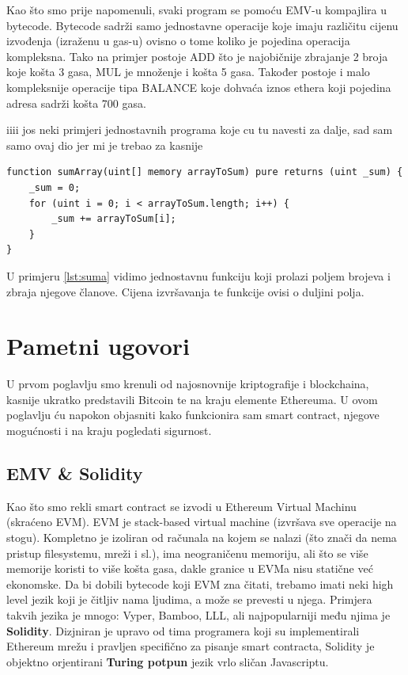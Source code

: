 \documentclass[a4paper,oneside,12pt]{memoir} %
\begin{document}
Kao što smo prije napomenuli, svaki program se pomoću EMV-u kompajlira u bytecode. Bytecode sadrži samo jednostavne operacije koje imaju različitu cijenu izvođenja (izraženu u gas-u) ovisno o tome koliko je pojedina operacija kompleksna. Tako na primjer postoje ADD što je najobičnije zbrajanje 2 broja koje košta 3 gasa, MUL je množenje i košta 5 gasa. Također postoje i malo kompleksnije operacije tipa BALANCE koje dohvaća iznos ethera koji pojedina adresa sadrži košta 700 gasa.

iiii jos neki primjeri jednostavnih programa koje cu tu navesti za dalje, sad sam samo ovaj dio   jer mi je trebao za kasnije

\begin{minipage}{\linewidth}
\begin{lstlisting}[caption = Primjer 1, language=solidity, label={lst:suma}]
function sumArray(uint[] memory arrayToSum) pure returns (uint _sum) {
    _sum = 0;
    for (uint i = 0; i < arrayToSum.length; i++) {
        _sum += arrayToSum[i];
    }
}
\end{lstlisting}
\end{minipage}

U primjeru \ref{lst:suma} vidimo jednostavnu funkciju koji prolazi poljem brojeva i zbraja njegove članove. Cijena izvršavanja te funkcije ovisi o duljini polja.

\chapter{Pametni ugovori}

U prvom poglavlju smo krenuli od najosnovnije kriptografije i blockchaina, kasnije ukratko predstavili Bitcoin te na kraju elemente Ethereuma. U ovom poglavlju ću napokon objasniti kako funkcionira sam smart contract, njegove mogućnosti i na kraju pogledati sigurnost.

\section{EMV \& Solidity}

Kao što smo rekli smart contract se izvodi u Ethereum Virtual Machinu (skraćeno EVM). EVM je stack-based virtual machine (izvršava sve operacije na stogu). Kompletno je izoliran od računala na kojem se nalazi (što znači da nema pristup filesystemu, mreži i sl.), ima neograničenu memoriju, ali što se više memorije koristi to više košta gasa, dakle granice u EVMa nisu statične već ekonomske. Da bi dobili bytecode koji EVM zna čitati, trebamo imati neki high level jezik koji je čitljiv nama ljudima, a može se prevesti u njega. Primjera takvih jezika je mnogo: Vyper, Bamboo, LLL, ali najpopularniji među njima je \textbf{Solidity}. Dizjniran je upravo od tima programera koji su implementirali Ethereum mrežu i pravljen specifično za pisanje smart contracta, Solidity je objektno orjentirani \textbf{Turing potpun} jezik vrlo sličan Javascriptu.
\end{document}
